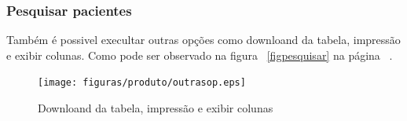 \subsubsection{Pesquisar pacientes}
Também é possivel execultar outras opções como downloand da tabela, impressão e exibir colunas. Como pode ser observado na figura ~\ref{figpesquisar} na página ~\pageref{figpesquisar}.
\begin{figure}[!htb]
    \centering
    \texttt{[image: figuras/produto/outrasop.eps]}
    \caption{Downloand da tabela, impressão e exibir colunas}
    \label{figoutrasop}
\end{figure}